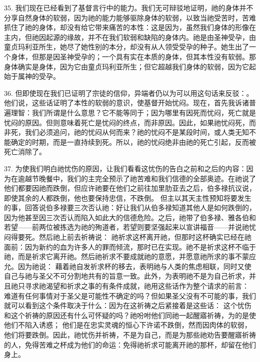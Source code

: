 35. 我们现在已经看到了基督言行中的能力。我们无可辩驳地证明，祂的身体并不分享自然身体的软弱，因为祂的能力能够驱除身体的软弱，以致当祂受苦时，苦难抓住了祂的身体，却没有给它带来痛苦的本性：这是因为，虽然我们身体的形像在主内，但祂因起源的缘故，并不在我们软弱和缺陷的身体内。祂是由圣神受孕，由童贞玛利亚所生，她尽了她性别的本分，却没有从人领受受孕的种子。她生出了一个身体，但那是因圣神受孕的；一个具有实在本质的身体，但其本性没有软弱。那身体确实是身体，因为它由童贞玛利亚所生；但它超越我们身体的软弱，因为它起始于属神的受孕。\par

36. 但即使现在我们已证明了宗徒的信仰，异端者仍以为可以用这句话来反驳：。他们说，这些话证明了本性的软弱的意识，使基督开始忧闷。现在，首先我诉诸普遍理智：我们所谓是什么意思？它不能等同于；因为哪里有因死而忧闷，死亡就是忧闷的原因。但则意味着死亡是忧闷的终点，而非原因。因此，如果祂忧闷死，而非死，我们必须追问，祂的忧闷从何而来？祂的忧闷不是某段时间，或人类无知不能确定的时期，而是一直持续到死。所以，祂的忧闷绝非由祂的死亡引起，反而被死亡消除了。\par

37. 为使我们明白祂忧伤的原因，让我们看看这忧伤的告白之前和之后的内容：因为在逾越节晚餐中，我们的主完全预示了祂苦难和我们信德的全部奥迹。在祂说了他们都要因祂而跌倒，但应许祂要在他们之前往加里肋亚去之后，伯多禄抗议说，即使其余的人都跌倒，他也要保持忠信，不跌倒。 但主以其天主性预知将要发生的事，回答说伯多禄要三次否认祂：好让我们从伯多禄知道其他人是如何跌倒的，因为他甚至因三次否认而陷入如此大的信德危险。之后，祂带了伯多禄、雅各伯和若望——前两位被拣选为祂的殉道者，若望则要坚强起来以宣讲福音——并说祂忧闷得要死。然后祂上前去祈祷说： 祂祈求这杯离开祂，但那时这杯确实已经在祂面前：因为新约的血为许多人的罪而倾流，那时已在实现。祂不是祈求这杯不临于祂，而是祈求它离开祂。然后祂祈求不要成就祂的意愿，并愿意祂所求的事不蒙应允。因为祂说： 藉着祂自发祈求杯的移去，表明祂与人类的焦虑相联，同时又使自己与祂与圣父不可分割地共有的旨意一致。此外，为表明祂不是为自己祈求，并且祂只寻求祂渴望和祈求之事的有条件成就，祂用这些话作为整个请求的前言： 难道有任何事情对于圣父是可能性不确定的吗？但如果圣父没有不可能的事，我们就可以看到这个条件取决于什么：因为在这祈祷之后紧接着是这些话： 这个忧伤和这个祈祷的原因还有什么可怀疑的吗？祂吩咐他们同祂一起醒寤祈祷，为的是使他们不陷入诱惑； 他们是在忠实灵魂的恒心下许诺不跌倒，然而因肉体的软弱，他们将要跌倒。因此，祂忧伤并祈祷，不是为自己，而是为那些祂劝告要醒寤祈祷的人，免得苦难之杯成为他们的命运：免得祂祈求可能离开祂的那杯，却留在他们身上。\par

